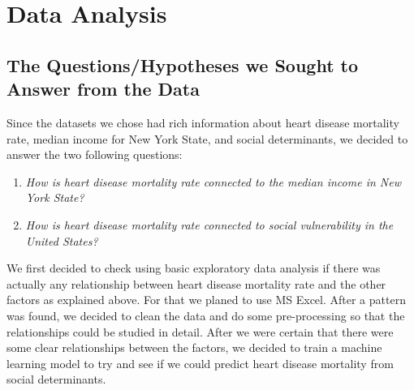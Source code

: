 \documentclass[journal,12pt,onecolumn]{IEEEtran}
\begin{document}
\section{Data Analysis}

\subsection{The Questions/Hypotheses we Sought to Answer from the Data}
Since the datasets we chose had rich information about heart disease mortality rate, median income for New York State, and social determinants, we decided to answer the two following questions:
\begin{enumerate}
\item \emph{How is heart disease mortality rate connected to the median income in New York State?}
\item \emph{How is heart disease mortality rate connected to social vulnerability in the United States?}
\end{enumerate} 

We first decided to check using basic exploratory data analysis if there was actually any relationship between heart disease mortality rate and the other factors as explained above.  
For that we planed to use MS Excel.
After a pattern was found, we decided to clean the data and do some pre-processing so that the relationships could be studied in detail.
After we were certain that there were some clear relationships between the factors, we decided to train a machine learning model to try and see if we could predict heart disease mortality from social determinants.
\end{document}
